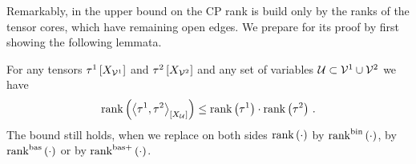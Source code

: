 Remarkably, in  the upper bound on the CP rank is build only by the ranks of the tensor cores, which have remaining open edges.
We prepare for its proof by first showing the following lemmata.

\begin{lemma}
    \label{lem:sparsityGeneralContraction}
    For any tensors $\tau^{1}\left[X_{\mathcal{V}^{1}}\right]$ and $\tau^{2}\left[X_{\mathcal{V}^{2}}\right]$ and any set of variables $\mathcal{U}\subset\mathcal{V}^{1}\cup\mathcal{V}^{2}$ we have
    \begin{align*}
        \mathrm{rank}\left(\left\langle \tau^{1},\tau^{2}\right\rangle_{\left[ X_{\mathcal{U}} \right]}\right) \leq \mathrm{rank}\left(\tau^{1}\right) \cdot \mathrm{rank}\left(\tau^{2}\right) \, .
    \end{align*}
    The bound still holds, when we replace on both sides $\mathrm{rank}\left(\cdot\right)$ by $\mathrm{rank}^{\mathrm{bin}}\left(\cdot\right)$, by $\mathrm{rank}^{\mathrm{bas}}\left(\cdot\right)$ or by $\mathrm{rank}^{\mathrm{bas+}}\left(\cdot\right)$.
\end{lemma}
